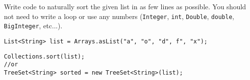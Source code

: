 Write code to naturally sort the given list in as few lines as possible. You should not need to write a loop or use any numbers (\texttt{Integer}, \texttt{int}, \texttt{Double}, \texttt{double},
\texttt{BigInteger}, etc...).
\begin{verbatim}
List<String> list = Arrays.asList("a", "o", "d", f", "x");
\end{verbatim}
\begin{answer}
\begin{verbatim}
Collections.sort(list);
//or
TreeSet<String> sorted = new TreeSet<String>(list);
\end{verbatim}
\end{answer}